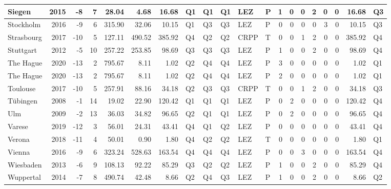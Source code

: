 \begin{tabular}{l|r|r|r|r|r|r|l|l|l|l|l|r|r|r|r|r|r|r|l}
\hline
Siegen & 2015 & -8 & 7 & 28.04 & 4.68 & 16.68 & Q1 & Q1 & Q1 & LEZ & P & 1 & 0 & 0 & 2 & 0 & 0 & 16.68 & Q3\\
\hline
Stockholm & 2016 & -9 & 6 & 315.90 & 32.06 & 10.15 & Q1 & Q3 & Q3 & LEZ & P & 0 & 0 & 0 & 0 & 3 & 0 & 10.15 & Q3\\
\hline
Strasbourg & 2017 & -10 & 5 & 127.11 & 490.52 & 385.92 & Q4 & Q2 & Q2 & CRPP & T & 0 & 0 & 1 & 2 & 0 & 0 & 385.92 & Q4\\
\hline
Stuttgart & 2012 & -5 & 10 & 257.22 & 253.85 & 98.69 & Q3 & Q3 & Q3 & LEZ & P & 1 & 0 & 0 & 2 & 0 & 0 & 98.69 & Q4\\
\hline
The Hague & 2020 & -13 & 2 & 795.67 & 8.11 & 1.02 & Q2 & Q4 & Q4 & LEZ & P & 3 & 0 & 0 & 0 & 0 & 0 & 1.02 & Q1\\
\hline
The Hague & 2020 & -13 & 2 & 795.67 & 8.11 & 1.02 & Q2 & Q4 & Q4 & LEZ & P & 2 & 0 & 0 & 0 & 0 & 0 & 1.02 & Q1\\
\hline
Toulouse & 2017 & -10 & 5 & 257.91 & 88.16 & 34.18 & Q2 & Q3 & Q3 & CRPP & T & 0 & 0 & 1 & 2 & 0 & 0 & 34.18 & Q3\\
\hline
Tübingen & 2008 & -1 & 14 & 19.02 & 22.90 & 120.42 & Q1 & Q1 & Q1 & LEZ & P & 0 & 2 & 0 & 0 & 0 & 0 & 120.42 & Q4\\
\hline
Ulm & 2009 & -2 & 13 & 36.03 & 34.82 & 96.65 & Q2 & Q1 & Q1 & LEZ & P & 0 & 2 & 0 & 0 & 0 & 0 & 96.65 & Q4\\
\hline
Varese & 2019 & -12 & 3 & 56.01 & 24.31 & 43.41 & Q4 & Q1 & Q2 & LEZ & P & 0 & 0 & 0 & 0 & 0 & 0 & 43.41 & Q4\\
\hline
Verona & 2018 & -11 & 4 & 50.01 & 0.90 & 1.80 & Q4 & Q2 & Q2 & LEZ & T & 0 & 0 & 0 & 0 & 0 & 0 & 1.80 & Q1\\
\hline
Vienna & 2016 & -9 & 6 & 323.24 & 528.63 & 163.54 & Q4 & Q4 & Q4 & LEZ & P & 0 & 0 & 3 & 0 & 0 & 0 & 163.54 & Q4\\
\hline
Wiesbaden & 2013 & -6 & 9 & 108.13 & 92.22 & 85.29 & Q3 & Q2 & Q2 & LEZ & P & 1 & 0 & 0 & 2 & 0 & 0 & 85.29 & Q4\\
\hline
Wuppertal & 2014 & -7 & 8 & 490.74 & 42.48 & 8.66 & Q2 & Q4 & Q3 & LEZ & P & 1 & 0 & 0 & 2 & 0 & 0 & 8.66 & Q2\\
\hline
\end{tabular}
